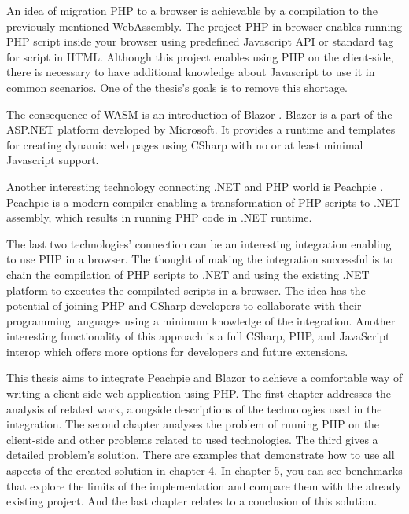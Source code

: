 An idea of migration PHP to a browser is achievable by a compilation to the previously mentioned WebAssembly.
The project PHP in browser \cite{2} enables running PHP script inside your browser using predefined Javascript API or standard tag for script in HTML.
Although this project enables using PHP on the client-side, there is necessary to have additional knowledge about Javascript to use it in common scenarios.
One of the thesis's goals is to remove this shortage.

The consequence of WASM is an introduction of Blazor \cite{3}.
Blazor is a part of the ASP.NET platform developed by Microsoft.
It provides a runtime and templates for creating dynamic web pages using CSharp with no or at least minimal Javascript support.

Another interesting technology connecting .NET and PHP world is Peachpie \cite{4}.
Peachpie is a modern compiler enabling a transformation of PHP scripts to .NET assembly, which results in running PHP code in .NET runtime.

The last two technologies' connection can be an interesting integration enabling to use PHP in a browser.
The thought of making the integration successful is to chain the compilation of PHP scripts to .NET and using the existing .NET platform to executes the compilated scripts in a browser.
The idea has the potential of joining PHP and CSharp developers to collaborate with their programming languages using a minimum knowledge of the integration.
Another interesting functionality of this approach is a full CSharp, PHP, and JavaScript interop which offers more options for developers and future extensions.

This thesis aims to integrate Peachpie and Blazor to achieve a comfortable way of writing a client-side web application using PHP.
The first chapter addresses the analysis of related work, alongside descriptions of the technologies used in the integration.
The second chapter analyses the problem of running PHP on the client-side and other problems related to used technologies.
The third gives a detailed problem's solution.
There are examples that demonstrate how to use all aspects of the created solution in chapter 4.
In chapter 5, you can see benchmarks that explore the limits of the implementation and compare them with the already existing project.
And the last chapter relates to a conclusion of this solution.
